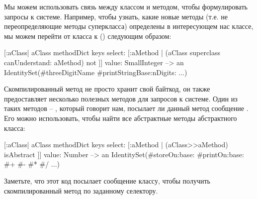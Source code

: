 \documentclass[a4paper,10pt,twoside]{book}
\begin{document}
Мы можем использовать связь между классом и методом, чтобы формулировать запросы к системе.
Например, чтобы узнать, какие новые методы (т.е. не переопределяющие методы суперкласса) определены в интересующем нас классе, мы можем перейти от класса к  () следующим образом:
\begin{code}{}
[:aClass| aClass methodDict keys select: [:aMethod |
  (aClass superclass canUnderstand: aMethod) not ]] value: SmallInteger
  --> an IdentitySet(#threeDigitName #printStringBase:nDigits: ...)
\end{code}

Скомпилированный метод не просто хранит свой байткод,
он также предоставляет несколько полезных методов для запросов к системе.
Один из таких методов -- , который говорит нам, посылает ли данный метод сообщение .
Его можно использовать, чтобы найти все абстрактные методы абстрактного класса:
\begin{code}{}
[:aClass| aClass methodDict keys select: [:aMethod |
  (aClass>>aMethod) isAbstract ]] value: Number
  --> an IdentitySet(#storeOn:base: #printOn:base: #+ #- #* #/ ...)
\end{code}
Заметьте, что этот код посылает сообщение \ct{>>} классу, чтобы получить скомпилированный метод по заданному селектору.
\end{document}
